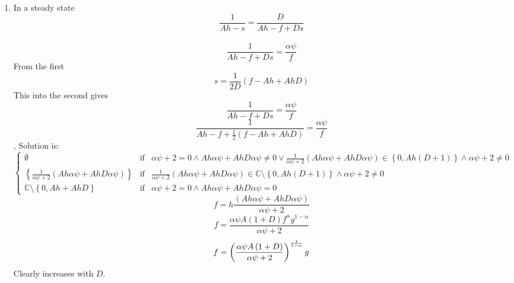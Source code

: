 \documentclass[12pt]{article}
\begin{document}
\begin{enumerate}
\begin{enumerate}
\item In a steady state%
\begin{equation*}
\frac{1}{Ah-s}=\frac{D}{Ah-f+Ds}
\end{equation*}%
$\allowbreak $ $\allowbreak $%
\begin{equation*}
\frac{1}{Ah-f+Ds}=\frac{\alpha \psi }{f}
\end{equation*}%
$\allowbreak $From the first%
\begin{equation*}
s=\frac{1}{2D}\left( f-Ah+AhD\right) 
\end{equation*}%
This into the second gives%
\begin{equation*}
\frac{1}{Ah-f+Ds}=\frac{\alpha \psi }{f}
\end{equation*}%
\begin{equation*}
\frac{1}{Ah-f+\frac{1}{2}\left( f-Ah+AhD\right) }=\frac{\alpha \psi }{f}
\end{equation*}%
, Solution is: $\left\{ 
\begin{array}{ccc}
\emptyset  & \text{if} & \alpha \psi +2=0\wedge Ah\alpha \psi +AhD\alpha
\psi \neq 0\vee \frac{1}{\alpha \psi +2}\left( Ah\alpha \psi +AhD\alpha \psi
\right) \in \left\{ 0,Ah\left( D+1\right) \right\} \wedge \alpha \psi +2\neq
0 \\ 
\left\{ \frac{1}{\alpha \psi +2}\left( Ah\alpha \psi +AhD\alpha \psi \right)
\right\}  & \text{if} & \frac{1}{\alpha \psi +2}\left( Ah\alpha \psi
+AhD\alpha \psi \right) \in 
\mathbb{C}
\setminus \left\{ 0,Ah\left( D+1\right) \right\} \wedge \alpha \psi +2\neq 0
\\ 
\mathbb{C}
\setminus \left\{ 0,Ah+AhD\right\}  & \text{if} & \alpha \psi +2=0\wedge
Ah\alpha \psi +AhD\alpha \psi =0%
\end{array}%
\right. \allowbreak \allowbreak $%
\begin{equation*}
f=h\frac{\left( Ah\alpha \psi +AhD\alpha \psi \right) }{\alpha \psi +2}
\end{equation*}%
\begin{equation*}
f=\frac{\alpha \psi A\left( 1+D\right) f^{\alpha }g^{1-\alpha }}{\alpha \psi
+2}
\end{equation*}%
\begin{equation*}
f=\left( \frac{\alpha \psi A\left( 1+D\right) }{\alpha \psi +2}\right) ^{%
\frac{1}{1-\alpha }}g
\end{equation*}%
Clearly increases with $D.$
\end{enumerate}
\end{enumerate}
\end{document}
